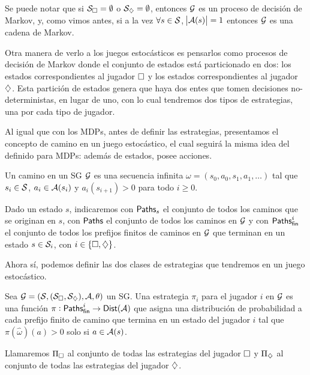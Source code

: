 Se puede notar que si $\mathcal{S}_\square = \emptyset$ o $\mathcal{S}_\diamondsuit = \emptyset$,
entonces $\mathcal{G}$ es un proceso de decisión de Markov, y, como vimos antes, si a la
vez $\forall s \in \mathcal{S}$, $\abs{\mathcal{A}(s)} = 1$ entonces $\mathcal{G}$ es una cadena de
Markov.

Otra manera de verlo a los juegos estocásticos es pensarlos como procesos de
decisión de Markov donde el conjunto de estados está particionado en dos: los
estados correspondientes al jugador $\square$ y los estados correspondientes al
jugador $\diamondsuit$. Esta partición de estados genera que haya dos entes que tomen
decisiones no-deterministas, en lugar de uno, con lo cual tendremos dos tipos
de estrategias, una por cada tipo de jugador.

Al igual que con los MDPs, antes de definir las estrategias, presentamos el
concepto de camino en un juego estocástico, el cual seguirá la misma idea del
definido para MDPs: además de estados, posee acciones.

\begin{definition}[Camino en un SG]
	Un camino en un SG $\mathcal{G}$ es una secuencia infinita $\omega = (s_0, a_0, s_1, a_1, \dots)$ tal que $s_i \in \mathcal{S}$, $a_i \in \mathcal{A}(s_i)$ y $a_i(s_{i+1}) > 0$ para todo $i \geq 0$.

	Dado un estado $s$, indicaremos con $\textsf{Paths}_s$ el conjunto de todos los caminos
	que se originan en $s$, con $\textsf{Paths}$ el conjunto de todos los caminos en $\mathcal{G}$ y
	con $\textsf{Paths}_\textsf{fin}^i$ el conjunto de todos los prefijos finitos de caminos en $\mathcal{G}$
	que terminan en un estado $s \in \mathcal{S}_i$, con $i \in \{\square, \diamondsuit\}$.
\end{definition}

Ahora sí, podemos definir las dos clases de estrategias que tendremos en un
juego estocástico.

\begin{definition}
	Sea $\mathcal{G} = (\mathcal{S}, (\mathcal{S}_\square, \mathcal{S}_\diamondsuit), \mathcal{A}, \theta)$ un SG. Una estrategia $\pi_i$ para el jugador $i$ en $\mathcal{G}$ es una función $\pi: \textsf{Paths}_\textsf{fin}^i \rightarrow \mathsf{Dist} (\mathcal{A})$ que asigna una distribución de probabilidad a cada prefijo finito de camino que termina en un estado del jugador $i$ tal que $\pi(\hat \omega) (a) > 0$ solo si $a \in \mathcal{A}(s)$.

	Llamaremos $\Pi_\square$ al conjunto de todas las estrategias del jugador $\square$
	y $\Pi_\diamondsuit$ al conjunto de todas las estrategias del jugador $\diamondsuit$.
\end{definition}

